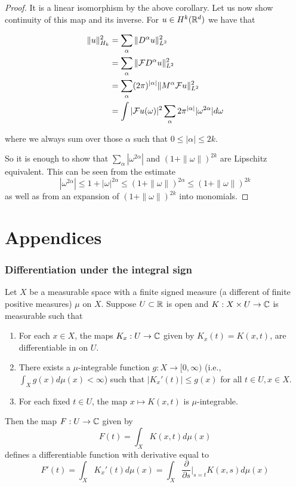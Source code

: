 \documentclass[twoside, a4paper, 10pt]{amsart}
\begin{document}
\begin{proof} It is a linear isomorphism by the above corollary. Let us now show continuity of this map and its inverse. For $u \in H^k(\mathbb{R}^d)$ we have that 

\begin{align*} \| u \|^2_{H_k} &= \sum_{\alpha} \| D^{\alpha}u\|_{L^2}^2 \\
&= \sum_{\alpha} \|\mathcal{F} D^{\alpha}u\|_{L^2}^2 \\
&= \sum_{\alpha} (2\pi)^{|\alpha|}\|M^{\alpha} \mathcal{F} u\|_{L^2}^2 \\ 
&= \int |\mathcal{F} u (\omega)|^2 \sum_{\alpha} 2\pi^{|\alpha|}|\omega^{2\alpha}| d\omega \end{align*}

where we always sum over those $\alpha$ such that $0 \leq |\alpha| \leq 2k$.

So it is enough to show that $\sum_{\alpha} |\omega^{2\alpha}|$ and $(1+\|\omega\|)^{2k}$ are Lipschitz equivalent. This can be seen from the estimate $$|\omega^{2\alpha}| \leq 1+|\omega|^{2\alpha} \leq (1+\|\omega\|)^{2\alpha} \leq (1+\|\omega \|)^{2k}$$ as well as from an expansion of $(1+\|\omega\|)^{2k}$ into monomials. \end{proof}












\part{Appendices}

\appendix

\section{Differentiation under the integral sign}

\begin{prop} \label{prop: diff under int} Let $X$ be a measurable space with a finite signed measure (a different of finite positive measures) $\mu$ on $X$. Suppose $U \subset \mathbb{R}$ is open and $K:X \times U \to \mathbb{C}$ is measurable such that

\begin{enumerate}
	\item For each $x \in X$, the maps $K_x:U \to \mathbb{C}$ given by $K_x(t) = K(x,t)$, are differentiable in on $U$. 
	\item There exists a $\mu$-integrable function $g:X \to [0,\infty)$ (i.e., $\int_X g(x) d\mu(x) < \infty$) such that $|K_x'(t)| \leq g(x)$ for all $t \in U, x \in X$.
	\item For each fixed $t \in U$, the map $x \mapsto K(x,t)$ is $\mu$-integrable.
\end{enumerate}

Then the map $F:U \to \mathbb{C}$ given by $$F(t) = \int_{X} K(x,t) d\mu(x)$$ defines a differentiable function with derivative equal to $$F'(t) = \int_X K_x'(t) d\mu(x) = \int_X \frac{\partial}{\partial s}|_{s = t} K(x,s) d\mu(x)$$

\end{prop}
\end{document}
